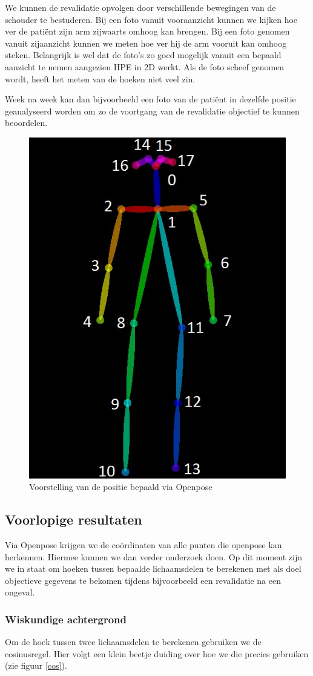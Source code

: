 \documentclass{article}
\begin{document}
We kunnen de revalidatie opvolgen door verschillende bewegingen van de schouder te bestuderen. Bij een foto vanuit vooraanzicht kunnen we kijken hoe ver de patiënt zijn arm zijwaarts omhoog kan brengen. Bij een foto genomen vanuit zijaanzicht kunnen we meten hoe ver hij de arm vooruit kan omhoog steken. Belangrijk is wel dat de foto's zo goed mogelijk vanuit een bepaald aanzicht te nemen aangezien HPE in 2D werkt. Als de foto scheef genomen wordt, heeft het meten van de hoeken niet veel zin.

Week na week kan dan bijvoorbeeld een foto van de patiënt in dezelfde positie geanalyseerd worden om zo de voortgang van de revalidatie objectief te kunnen beoordelen. 

\begin{figure}[H]
	\centering
	\caption{Voorstelling van de positie bepaald via Openpose}
	\label{fig:skelet}
	\includegraphics[width=.5\textwidth]{HPE_skelet}
\end{figure}


	\subsection{Voorlopige resultaten}

Via Openpose krijgen we de coördinaten van alle punten die openpose kan herkennen. Hiermee kunnen we dan verder onderzoek doen. Op dit moment zijn we in staat om hoeken tussen bepaalde lichaamsdelen te berekenen met als doel objectieve gegevens te bekomen tijdens bijvoorbeeld een revalidatie na een ongeval.

\subsubsection{Wiskundige achtergrond}
Om de hoek tussen twee lichaamsdelen te berekenen gebruiken we de cosinusregel. Hier volgt een klein beetje duiding over hoe we die precies gebruiken (zie figuur \ref{cos}).\\
\end{document}
